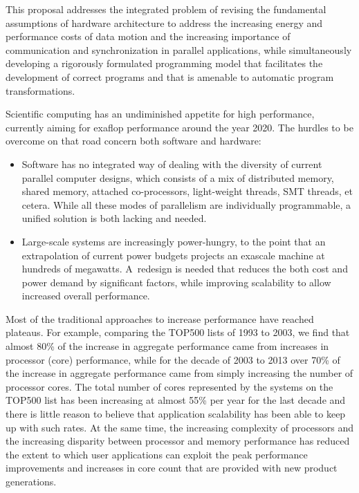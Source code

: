 
This proposal addresses the integrated problem of revising the fundamental 
assumptions of hardware architecture to address the increasing energy and performance costs of
data motion and the increasing importance of communication and synchronization
in parallel applications, while simultaneously developing a rigorously formulated programming model 
that facilitates the development of correct programs and that is amenable to 
automatic program transformations.

Scientific computing has an undiminished appetite for high performance,
currently aiming for exaflop performance around the year 2020.
The hurdles to be overcome on that road concern both software and hardware:
\begin{itemize}
\item Software has no integrated way of dealing with the diversity of
  current parallel computer designs, which consists of a mix of
  distributed memory, shared memory, attached co-processors,
  light-weight threads, SMT threads, et cetera. While all these
  modes of parallelism are individually programmable, a unified solution
  is both lacking and needed.
\item Large-scale systems are increasingly power-hungry, to the point
  that an extrapolation of current power budgets projects an
  exascale machine at hundreds of megawatts. A~redesign is needed that
  reduces the both cost and power demand by significant factors, while improving
  scalability to allow increased overall performance.
\end{itemize}

Most of the traditional approaches to increase performance have reached
plateaus.  For example, comparing the TOP500 lists of 1993 to 2003, we find that
almost 80\% of the increase in aggregate performance came from increases in 
processor (core)
performance, while for the decade of 2003 to 2013 over 70\% of the increase in aggregate
performance came from simply increasing the number of processor cores.
The total number of cores represented by the systems on the TOP500 list has been increasing
at almost 55\% per year for the last decade and there is little reason to believe that
application scalability has been able to keep up with such rates.   At the same time,
the increasing complexity of processors and the increasing disparity between processor
and memory performance has reduced the extent to which user applications can exploit
the peak performance improvements and increases in core count that are provided with
new product generations.

